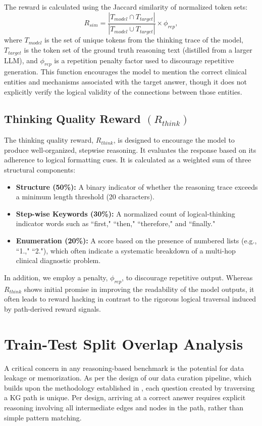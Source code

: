 \documentclass{article}
\theoremstyle{plain}
\theoremstyle{definition}
\theoremstyle{remark}
\begin{document}
The reward is calculated using the Jaccard similarity of normalized token sets:
\[
R_{sim} = \frac{|T_{model} \cap T_{target}|}{|T_{model} \cup T_{target}|} \times \phi_{rep},
\]
where $T_{model}$ is the set of unique tokens from the thinking trace of the model, $T_{target}$ is the token set of the ground truth reasoning text (distilled from a larger LLM), and $\phi_{rep}$ is a repetition penalty factor used to discourage repetitive generation. This function encourages the model to mention the correct clinical entities and mechanisms associated with the target answer, though it does not explicitly verify the logical validity of the connections between those entities.

\subsection{Thinking Quality Reward $(R_{think})$}
The thinking quality reward, $R_{think}$, is designed to encourage the model to produce well-organized, stepwise reasoning. It evaluates the response based on its adherence to logical formatting cues. It is calculated as a weighted sum of three structural components:
\begin{itemize}
    \item \textbf{Structure (50\%):} A binary indicator of whether the reasoning trace exceeds a minimum length threshold (20 characters).
    \item \textbf{Step-wise Keywords (30\%):} A normalized count of logical-thinking indicator words such as ``first," ``then," ``therefore," and ``finally."
    \item \textbf{Enumeration (20\%):} A score based on the presence of numbered lists (e.g., ``1.," ``2."), which often indicate a systematic breakdown of a multi-hop clinical diagnostic problem.
\end{itemize}

In addition, we employ a penalty, $\phi_{rep}$, to discourage repetitive output. Whereas $R_{think}$ shows initial promise in improving the readability of the model outputs, it often leads to reward hacking in contrast to the rigorous logical traversal induced by path-derived reward signals.

\newpage
\section{Train-Test Split Overlap Analysis}
\label{Appendix D}

A critical concern in any reasoning-based benchmark is the potential for data leakage or memorization. As per the design of our data curation pipeline, which builds upon the methodology established in \cite{Dedhia2025Bottom-upNeed}, each question created by traversing a KG path is unique. Per design, arriving at a correct answer requires explicit reasoning involving all intermediate edges and nodes in the path, rather than simple pattern matching.
\end{document}
